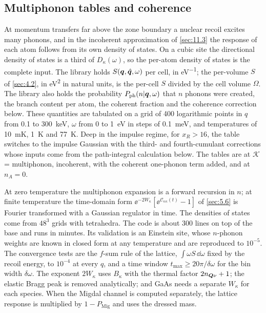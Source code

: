 \subsection{Multiphonon tables and coherence}

At momentum transfers far above the zone boundary a nuclear recoil excites many phonons, and in the incoherent approximation of \cref{sec:11.3} the response of each atom follows from its own density of states. On a cubic site the directional density of states is a third of $D_\kappa(\omega)$, so the per-atom density of states is the complete input. The library holds $S(\bm{q},\hat{\bm{q}},\omega)$ per cell, in \si{eV^{-1}}; the per-volume $S$ of \cref{sec:4.2}, in \si{eV^2} in natural units, is the per-cell $S$ divided by the cell volume $\Omega$. The library also holds the probability $P_{\mathrm{ph}}(n|\bm{q},\omega)$ that $n$ phonons were created, the branch content per atom, the coherent fraction and the coherence correction below. These quantities are tabulated on a grid of 400 logarithmic points in $q$ from 0.1 to \SI{300}{keV}, $\omega$ from 0 to \SI{1}{eV} in steps of \SI{0.1}{meV}, and temperatures of \SI{10}{mK}, \SI{1}{K} and \SI{77}{K}. Deep in the impulse regime, for $x_R > 16$, the table switches to the impulse Gaussian with the third- and fourth-cumulant corrections whose inputs come from the path-integral calculation below. The tables are at $\mathcal{K}$ = multiphonon, incoherent, with the coherent one-phonon term added, and at $n_A = 0$.

At zero temperature the multiphonon expansion is a forward recursion in $n$; at finite temperature the time-domain form $\ee^{-2W_\kappa}[\ee^{\mathcal{C}_{\kappa\kappa}(t)} - 1]$ of \cref{sec:5.6} is Fourier transformed with a Gaussian regulator in time. The densities of states come from $48^3$ grids with tetrahedra. The code is about 300 lines on top of the base and runs in minutes. Its validation is an Einstein site, whose $n$-phonon weights are known in closed form at any temperature and are reproduced to $10^{-5}$. The convergence tests are the $f$-sum rule of the lattice, $\int\omega S\,\dd\omega$ fixed by the recoil energy, to $10^{-4}$ at every $q$, and a time window $t_{\mathrm{max}} \ge 20\pi/\delta\omega$ for the bin width $\delta\omega$. The exponent $2W_\kappa$ uses $B_\kappa$ with the thermal factor $2n_{\bm{Q}\nu} + 1$; the elastic Bragg peak is removed analytically; and GaAs needs a separate $W_\kappa$ for each species. When the Migdal channel is computed separately, the lattice response is multiplied by $1 - P_{\mathrm{Mig}}$ and uses the dressed mass.

